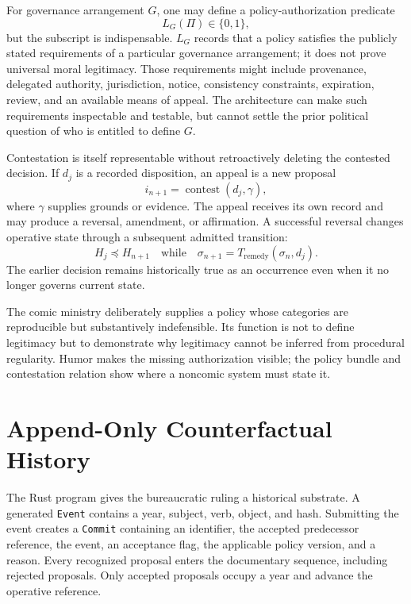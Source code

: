 \documentclass[11pt]{article}
\begin{document}
For governance arrangement $G$, one may define a policy-authorization predicate
\begin{equation}
  L_G(\Pi)\in\{0,1\},
  \label{eq:relative-legitimacy}
\end{equation}
but the subscript is indispensable. $L_G$ records that a policy satisfies the publicly stated requirements of a particular governance arrangement; it does not prove universal moral legitimacy. Those requirements might include provenance, delegated authority, jurisdiction, notice, consistency constraints, expiration, review, and an available means of appeal. The architecture can make such requirements inspectable and testable, but cannot settle the prior political question of who is entitled to define $G$.

Contestation is itself representable without retroactively deleting the contested decision. If $d_j$ is a recorded disposition, an appeal is a new proposal
\begin{equation}
  i_{n+1}=\operatorname{contest}(d_j,\gamma),
  \label{eq:contestation}
\end{equation}
where $\gamma$ supplies grounds or evidence. The appeal receives its own record and may produce a reversal, amendment, or affirmation. A successful reversal changes operative state through a subsequent admitted transition:
\begin{equation}
  H_j\preceq H_{n+1}
  \quad\text{while}\quad
  \sigma_{n+1}=T_{\mathrm{remedy}}(\sigma_n,d_j).
  \label{eq:remedial-transition}
\end{equation}
The earlier decision remains historically true as an occurrence even when it no longer governs current state.

The comic ministry deliberately supplies a policy whose categories are reproducible but substantively indefensible. Its function is not to define legitimacy but to demonstrate why legitimacy cannot be inferred from procedural regularity. Humor makes the missing authorization visible; the policy bundle and contestation relation show where a noncomic system must state it.

\section{Append-Only Counterfactual History}

The Rust program gives the bureaucratic ruling a historical substrate. A generated \texttt{Event} contains a year, subject, verb, object, and hash. Submitting the event creates a \texttt{Commit} containing an identifier, the accepted predecessor reference, the event, an acceptance flag, the applicable policy version, and a reason. Every recognized proposal enters the documentary sequence, including rejected proposals. Only accepted proposals occupy a year and advance the operative reference.
\end{document}
